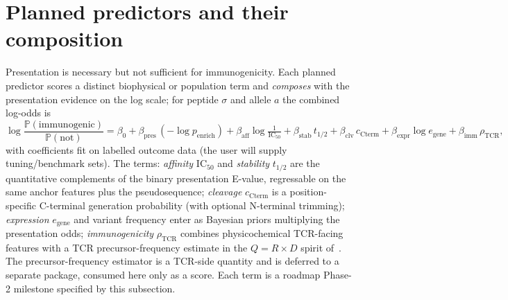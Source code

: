 \documentclass[11pt]{article}
\theoremstyle{oldplain}
\theoremstyle{oldrem}
\newcommand{\Prob}{\mathbb{P}}
\begin{document}
\section{Planned predictors and their composition}\label{sec:predictors}
Presentation is necessary but not sufficient for immunogenicity. Each planned predictor scores a
distinct biophysical or population term and \emph{composes} with the presentation evidence on the log
scale; for peptide $\sigma$ and allele $a$ the combined log-odds is
\begin{equation}\label{eq:combine}
  \log\frac{\Prob(\text{immunogenic})}{\Prob(\text{not})}
  = \beta_0
  + \beta_{\mathrm{pres}}\,(-\!\log p_{\mathrm{enrich}})
  + \beta_{\mathrm{aff}}\log\!\tfrac{1}{\mathrm{IC}_{50}}
  + \beta_{\mathrm{stab}}\,t_{1/2}
  + \beta_{\mathrm{clv}}\,c_{\mathrm{Cterm}}
  + \beta_{\mathrm{expr}}\log e_{\mathrm{gene}}
  + \beta_{\mathrm{imm}}\,\rho_{\mathrm{TCR}} ,
\end{equation}
with coefficients fit on labelled outcome data (the user will supply tuning/benchmark sets). The
terms: \emph{affinity} $\mathrm{IC}_{50}$ and \emph{stability} $t_{1/2}$ are the quantitative
complements of the binary presentation E-value, regressable on the same anchor features plus the
pseudosequence; \emph{cleavage} $c_{\mathrm{Cterm}}$ is a position-specific C-terminal generation
probability (with optional N-terminal trimming); \emph{expression} $e_{\mathrm{gene}}$ and variant
frequency enter as Bayesian priors multiplying the presentation odds; \emph{immunogenicity}
$\rho_{\mathrm{TCR}}$ combines physicochemical TCR-facing features with a TCR precursor-frequency
estimate in the $Q=R\times D$ spirit of~\cite{Luksza2022}. The precursor-frequency estimator is a
TCR-side quantity and is deferred to a separate package, consumed here only as a score. Each term is
a roadmap Phase-2 milestone specified by this subsection.
\end{document}
